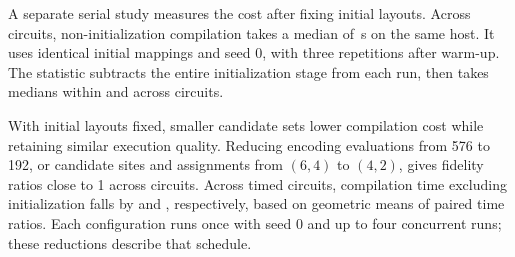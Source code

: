 A separate serial study measures the cost after fixing initial layouts. Across \GAMainFixedLayoutCircuitN{} circuits, non-initialization compilation takes a median of \GAMainPostInitialMedianSeconds\,s on the same host. It uses identical initial mappings and seed 0, with three repetitions after \mbox{warm-up}. The statistic subtracts the entire initialization stage from each run, then takes medians within and across circuits.

With initial layouts fixed, smaller candidate sets lower compilation cost while retaining similar execution quality. Reducing encoding evaluations from 576 to 192, or candidate sites and assignments from $(6,4)$ to $(4,2)$, gives fidelity ratios close to 1 across \SensitivityFidelityN{} circuits. Across \GAMainBudgetTimingN{} timed circuits, compilation time excluding initialization falls by  and , respectively, based on geometric means of paired time ratios. Each configuration runs once with seed 0 and up to four concurrent runs; these reductions describe that schedule.
